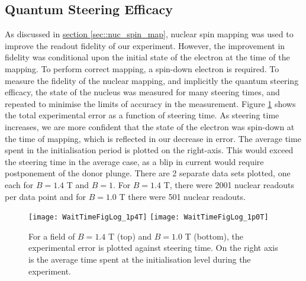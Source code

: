 \label{sec::results}
\subsection{Quantum Steering Efficacy}
	\label{sec::steering}

	As discussed in \hyperref[sec::nuc_spin_map]{section \ref{sec::nuc_spin_map}}, nuclear spin mapping was used to improve the readout fidelity of our experiment. However, the improvement in fidelity was conditional upon the initial state of the electron at the time of the mapping. To perform correct mapping, a spin-down electron is required. To measure the fidelity of the nuclear mapping, and implicitly the quantum steering efficacy, the state of the nucleus was measured for many steering times, and repeated to minimise the limits of accuracy in the measurement. Figure \ref{fig::wait_time} shows the total experimental error as a function of steering time. As steering time increases, we are more confident that the state of the electron was spin-down at the time of mapping, which is reflected in our decrease in error. The average time spent in the initialisation period is plotted on the right-axis. This would exceed the steering time in the average case, as a blip in current would require postponement of the donor plunge.	There are 2 separate data sets plotted, one each for $B = 1.4$ T and $B = 1$. For $B = 1.4$ T, there were 2001 nuclear readouts per data point and for $B = 1.0$ T there were 501 nuclear readouts.
	
	\begin{figure}[htbp!]
		\centering
		\vspace{-1cm}
		\texttt{[image: WaitTimeFigLog\_1p4T]}
		\texttt{[image: WaitTimeFigLog\_1p0T]}
		\caption[Experimental fidelity with varying steering times.]{For a field of $B = 1.4$ T (top) and $B = 1.0$ T (bottom), the experimental error is plotted against steering time. On  the right axis is the average time spent at the initialisation level during the experiment.}
		\label{fig::wait_time}
	\end{figure}
		

